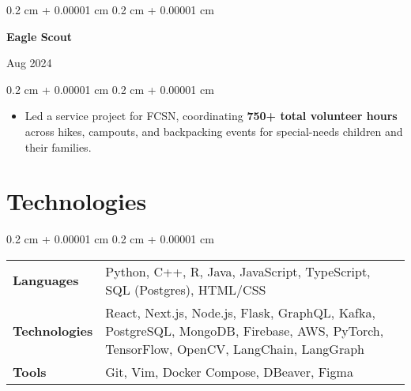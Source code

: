 \documentclass[10pt, letterpaper]{article}
\newenvironment{highlights}{
    \begin{itemize}[
        topsep=0.10 cm,
        parsep=0.10 cm,
        partopsep=0pt,
        itemsep=0pt,
        leftmargin=0.4 cm + 10pt
    ]
}{
    \end{itemize}
} %
\newenvironment{onecolentry}{
    \begin{adjustwidth}{
        0.2 cm + 0.00001 cm
    }{
        0.2 cm + 0.00001 cm
    }
}{
    \end{adjustwidth}
} %
\newenvironment{twocolentry}[2][]{
    \onecolentry
    \def\secondColumn{#2}
    \setcolumnwidth{\fill, 5 cm}
    \begin{paracol}{2}
}{
    \switchcolumn \raggedleft \secondColumn
    \end{paracol}
    \endonecolentry
} %
\begin{document}
        \begin{twocolentry}{
        Aug 2024}
            \textbf{Eagle Scout}
        \end{twocolentry}

        \vspace{0.10 cm}
        \begin{onecolentry}
            \begin{highlights}
                \item Led a service project for FCSN, coordinating \textbf{750+ total volunteer hours} across hikes, campouts, and backpacking events for special-needs children and their families.
            \end{highlights}
        \end{onecolentry}


    \section{Technologies}
    
        \begin{onecolentry}
            \begin{tabularx}{\textwidth}{@{}p{2.15cm}Y@{}}
                \textbf{Languages} & Python, C++, R, Java, JavaScript, TypeScript, SQL (Postgres), HTML/CSS \\[0.1cm]
                \textbf{Technologies} & React, Next.js, Node.js, Flask, GraphQL, Kafka, PostgreSQL, MongoDB, Firebase, AWS, PyTorch, TensorFlow, OpenCV, LangChain, LangGraph \\[0.5cm]
                \textbf{Tools} & Git, Vim, Docker Compose, DBeaver, Figma
            \end{tabularx}
        \end{onecolentry}
\end{document}

